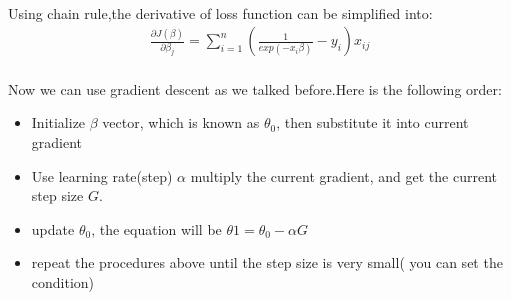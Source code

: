 \documentclass[a4paper,12pt]{article}
\begin{document}
\begin{spacing}{2}
\paragraph{ }Using chain rule,the derivative of loss function  can be simplified into:
\begin{align}
\frac{\partial J(\beta)}{\partial\beta_{j}}=\sum_{i=1}^{n}(\frac{1}{exp(-x_{i}\beta)}-y_{i})x_{ij}
\end{align}
\paragraph{ }Now we can use gradient descent as we talked before.Here is the following order:
\begin{itemize}
\item Initialize $\beta$ vector, which is known as $\theta_{0}$, then substitute it into current gradient
\item Use learning rate(step) $\alpha$ multiply the current gradient, and get the current step size $G$.
\item update $\theta_{0}$, the equation will be $ \theta{1}=\theta_{0}-\alpha G$
\item repeat the procedures above until the step size is very small( you can set the condition)
\end{itemize}
\end{spacing}
\end{document}
